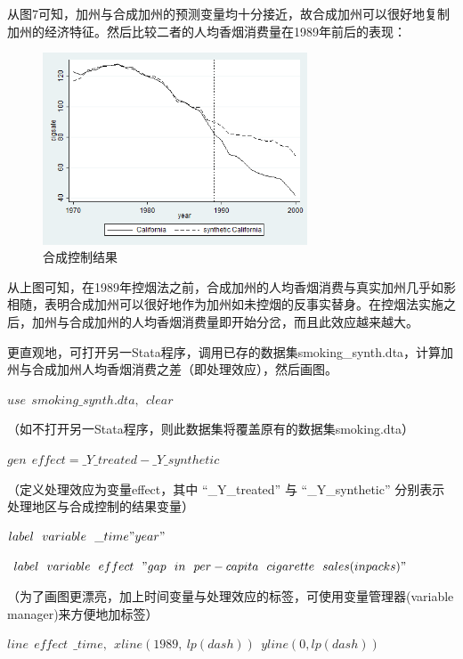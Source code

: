 \documentclass[cn,12pt,math=newtx,citestyle=gb7714-2015,bibstyle=gb7714-2015]{elegantbook}
\begin{document}
	从图7可知，加州与合成加州的预测变量均十分接近，故合成加州可以很好地复制加州的经济特征。然后比较二者的人均香烟消费量在1989年前后的表现：
	
	\begin{figure}[htbp]
		\centering
		\includegraphics[width=0.7\textwidth]{synth.png}
		\caption{合成控制结果}\label{fig:digit}
	\end{figure}
	
	从上图可知，在1989年控烟法之前，合成加州的人均香烟消费与真实加州几乎如影相随，表明合成加州可以很好地作为加州如未控烟的反事实替身。在控烟法实施之后，加州与合成加州的人均香烟消费量即开始分岔，而且此效应越来越大。
	
	更直观地，可打开另一Stata程序，调用已存的数据集smoking\_synth.dta，计算加州与合成加州人均香烟消费之差（即处理效应），然后画图。
	
	\textbf{$use~~smoking\_synth.dta,~~clear$}
	
	（如不打开另一Stata程序，则此数据集将覆盖原有的数据集smoking.dta）
	
	\textbf{$gen~~effect= \_Y\_treated - \_Y\_synthetic$}
	
	（定义处理效应为变量effect，其中 “\_Y\_treated” 与 “\_Y\_synthetic” 分别表示处理地区与合成控制的结果变量）
	
	\textbf{$label~~variable~~\_time "year"$}
	
	\textbf{$label~~variable~~effect~~"gap~~in~~per-capita~~cigarette~~sales (in packs)"$}
	
	（为了画图更漂亮，加上时间变量与处理效应的标签，可使用变量管理器(variable manager)来方便地加标签）
	
	\textbf{$line~~effect~~\_time,~~xline(1989,~lp(dash))~~yline(0,lp(dash))$}
	
\end{document}

